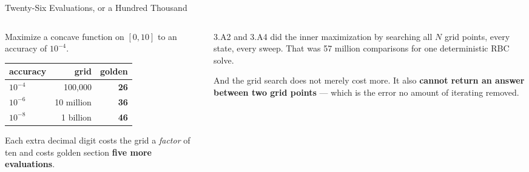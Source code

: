 \begin{frame}{Twenty-Six Evaluations, or a Hundred Thousand}
\begin{columns}[T]
\begin{column}{0.50\textwidth}
\small
Maximize a concave function on $[0,10]$ to an accuracy of $10^{-4}$.
\medskip
\begin{center}\footnotesize
\begin{tabularx}{\linewidth}{@{}>{\raggedright\arraybackslash}X r r@{}}
\toprule
\textbf{accuracy} & \textbf{grid} & \textbf{golden} \\
\midrule
$10^{-4}$ & 100{,}000 & \textbf{26} \\
$10^{-6}$ & 10 million & \textbf{36} \\
$10^{-8}$ & 1 billion & \textbf{46} \\
\bottomrule
\end{tabularx}
\end{center}
\medskip
Each extra decimal digit costs the grid a \emph{factor} of ten and costs golden section \textbf{five more evaluations}.
\end{column}
\begin{column}{0.47\textwidth}
\begin{conceptbox}[title=\textbf{Where this bites}]\small
3.A2 and 3.A4 did the inner maximization by searching all $N$ grid points, every state, every sweep. That was 57 million comparisons for one deterministic RBC solve.
\end{conceptbox}
\medskip
\begin{takeawaybox}\footnotesize
And the grid search does not merely cost more. It also \textbf{cannot return an answer between two grid points} --- which is the error no amount of iterating removed.
\end{takeawaybox}
\end{column}
\end{columns}
\end{frame}

